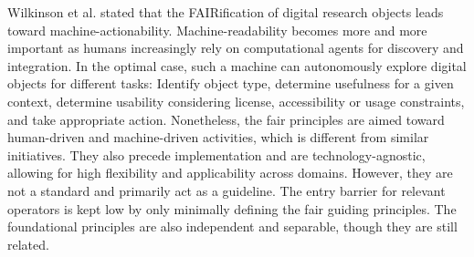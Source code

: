 Wilkinson et al. stated that the FAIRification of digital research objects leads toward machine-actionability. Machine-readability becomes more and more important as humans increasingly rely on computational agents for discovery and integration. In the optimal case, such a machine can autonomously explore digital objects for different tasks: Identify object type, determine usefulness for a given context, determine usability considering license, accessibility or usage constraints, and take appropriate action. Nonetheless, the \acrshort{fair} principles are aimed toward human-driven and machine-driven activities, which is different from similar initiatives. They also precede implementation and are technology-agnostic, allowing for high flexibility and applicability across domains. However, they are not a standard and primarily act as a guideline. The entry barrier for relevant operators is kept low by only minimally defining the \acrshort{fair} guiding principles. The foundational principles are also independent and separable, though they are still related.



